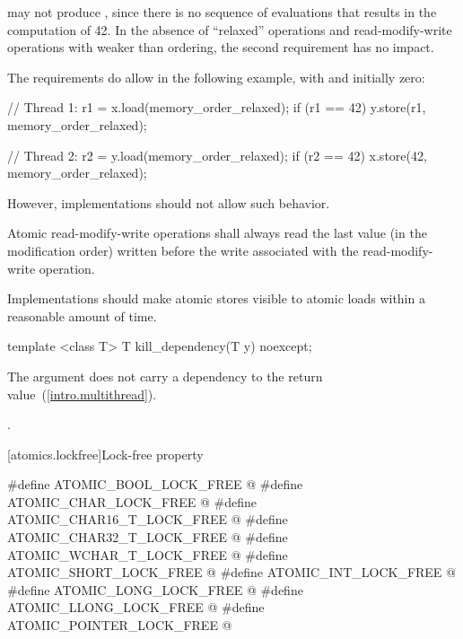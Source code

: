 may not produce , since there is no sequence of evaluations that
results in the computation of 42. In the absence of ``relaxed'' operations and
read-modify-write operations with weaker than  ordering, the
second requirement has no impact.\exitnote

\pnum
\enternote The requirements do allow  in the following example,
with  and  initially zero:

\begin{codeblock}
// Thread 1:
r1 = x.load(memory_order_relaxed);
if (r1 == 42) y.store(r1, memory_order_relaxed);
\end{codeblock}

\begin{codeblock}
// Thread 2:
r2 = y.load(memory_order_relaxed);
if (r2 == 42) x.store(42, memory_order_relaxed);
\end{codeblock}

However, implementations should not allow such behavior.\exitnote

\pnum
Atomic read-modify-write operations shall always read the last value
(in the modification order) written before the write associated with
the read-modify-write operation.

\pnum
Implementations should make atomic stores visible to atomic loads within a reasonable
amount of time.

%
\begin{itemdecl}
template <class T>
  T kill_dependency(T y) noexcept;
\end{itemdecl}

\begin{itemdescr}
\pnum
\effects The argument does not carry a dependency to the return
value~(\ref{intro.multithread}).

\pnum
\returns {}.
\end{itemdescr}


[atomics.lockfree]{Lock-free property}

\begin{codeblock}
#define ATOMIC_BOOL_LOCK_FREE @\unspec@
#define ATOMIC_CHAR_LOCK_FREE @\unspec@
#define ATOMIC_CHAR16_T_LOCK_FREE @\unspec@
#define ATOMIC_CHAR32_T_LOCK_FREE @\unspec@
#define ATOMIC_WCHAR_T_LOCK_FREE @\unspec@
#define ATOMIC_SHORT_LOCK_FREE @\unspec@
#define ATOMIC_INT_LOCK_FREE @\unspec@
#define ATOMIC_LONG_LOCK_FREE @\unspec@
#define ATOMIC_LLONG_LOCK_FREE @\unspec@
#define ATOMIC_POINTER_LOCK_FREE @\unspec@
\end{codeblock}

